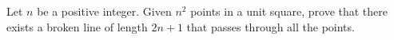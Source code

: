 Let $n$ be a positive integer. Given $n^2$ points in a unit square, prove that there exists a broken line of length $2n + 1$ that passes through all the points.